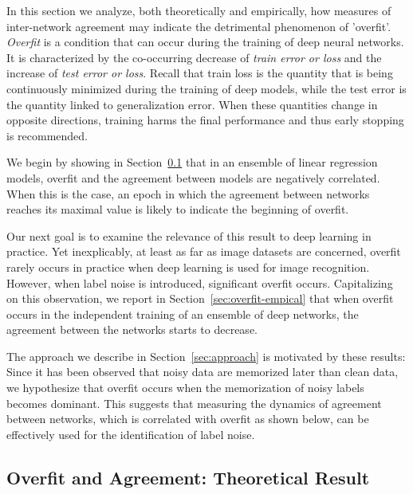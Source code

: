 \documentclass{article}
\begin{document}
In this section we analyze, both theoretically and empirically, how measures of inter-network agreement may indicate the detrimental phenomenon of 'overfit'. \emph{Overfit} is a condition that can occur during the training of deep neural networks. It is characterized by the co-occurring decrease of \emph{train error or loss} and the increase of \emph{test error or loss}. Recall that train loss is the quantity that is being continuously minimized during the training of deep models, while the test error is the quantity linked to generalization error. When these quantities change in opposite directions, training harms the final performance and thus early stopping is recommended. 

We begin by showing in Section~\ref{sec:theory} that in an ensemble of linear regression models, overfit and the agreement between models are negatively correlated. When this is the case, an epoch in which the agreement between networks reaches its maximal value is likely to indicate the beginning of overfit. 

Our next goal is to examine the relevance of this result to deep learning in practice. Yet inexplicably, at least as far as image datasets are concerned, overfit rarely occurs in practice when deep learning is used for image recognition. However, when label noise is introduced, significant overfit occurs. Capitalizing on this observation, we report in Section~\ref{sec:overfit-empical} that when overfit occurs in the independent training of an ensemble of deep networks, the agreement between the networks starts to decrease.

The approach we describe  in Section~\ref{sec:approach} is motivated by these results:
Since it has been observed that noisy data are memorized later than clean data, we hypothesize that overfit occurs when the memorization of noisy labels becomes dominant. This suggests that measuring the dynamics of agreement between networks, which is correlated with overfit as shown below,  can be effectively used for the identification of label noise. 



\subsection{Overfit and Agreement: Theoretical Result}
\label{sec:theory}
\end{document}

